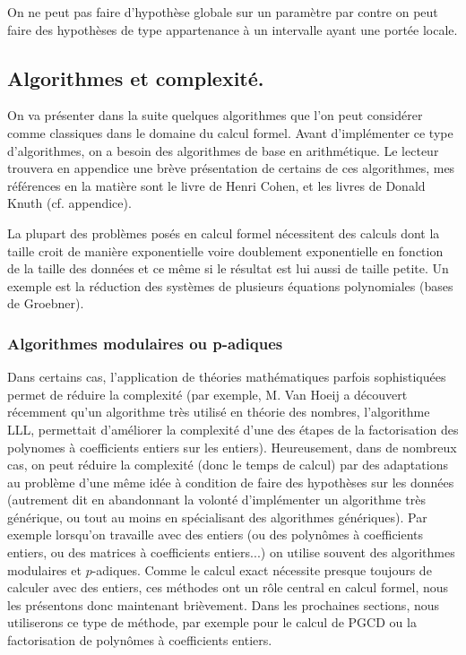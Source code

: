\documentclass[a4paper,11pt]{article}
\begin{document}
On ne peut pas faire d'hypothèse globale sur un paramètre par
contre on peut faire des hypothèses de type appartenance à un intervalle 
ayant une portée locale.

\subsection{Algorithmes et complexité.}
On va présenter dans la suite quelques algorithmes que l'on peut
considérer comme classiques dans le domaine du calcul formel. Avant 
d'implémenter ce type d'algorithmes, on a besoin des algorithmes de base
en arithmétique. Le lecteur trouvera en appendice une brève présentation
de certains de ces algorithmes, mes références en la matière sont le livre
de Henri Cohen, et les livres de Donald Knuth (cf. appendice).

La plupart des problèmes posés en calcul formel nécessitent des
calculs dont la taille croit de manière exponentielle voire
doublement exponentielle en fonction de la taille des données et
ce même si le résultat est lui aussi de taille petite. Un
exemple est la réduction des systèmes de plusieurs équations polynomiales
(bases de Groebner).

\subsubsection{Algorithmes modulaires ou p-adiques}
Dans certains cas, l'application de théories mathématiques
parfois sophistiquées permet de réduire la complexité (par exemple,
M. Van Hoeij a découvert récemment qu'un algorithme très utilisé en théorie des
nombres, l'algorithme LLL, permettait d'améliorer la complexité d'une des
étapes de la factorisation des polynomes à coefficients entiers sur les
entiers). Heureusement, dans de nombreux cas, on peut r\'eduire la
complexit\'e (donc le temps de calcul) par des adaptations au
probl\`eme d'une m\^eme id\'ee \`a condition de faire des
hypoth\`eses sur les donn\'ees (autrement dit en abandonnant la volont\'e
d'impl\'ementer un algorithme tr\`es g\'en\'erique, ou tout au moins
en sp\'ecialisant des algorithmes g\'en\'eriques).
 Par exemple lorsqu'on travaille
avec des entiers (ou des polyn\^omes \`a coefficients entiers, ou
des matrices \`a coefficients entiers...) on utilise souvent des algorithmes
modulaires et $p$-adiques. Comme le calcul exact n\'ecessite
presque toujours de calculer avec des entiers, ces m\'ethodes
ont un r\^ole central en calcul formel, nous les pr\'esentons donc
maintenant bri\`evement. Dans les prochaines sections, nous utiliserons
ce type de m\'ethode, par exemple pour le calcul de PGCD ou la factorisation
de polyn\^omes \`a coefficients entiers.
\end{document}
